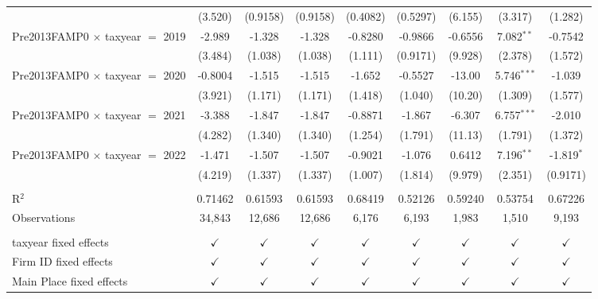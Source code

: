 \begin{tabular}{lcccccccc}
                                           & (3.520)       & (0.9158)      & (0.9158)      & (0.4082)       & (0.5297)        & (6.155)       & (3.317)       & (1.282)\\   
   Pre2013FAMP0 $\times$ taxyear $=$ 2019  & -2.989        & -1.328        & -1.328        & -0.8280        & -0.9866         & -0.6556       & 7.082$^{**}$  & -0.7542\\   
                                           & (3.484)       & (1.038)       & (1.038)       & (1.111)        & (0.9171)        & (9.928)       & (2.378)       & (1.572)\\   
   Pre2013FAMP0 $\times$ taxyear $=$ 2020  & -0.8004       & -1.515        & -1.515        & -1.652         & -0.5527         & -13.00        & 5.746$^{***}$ & -1.039\\   
                                           & (3.921)       & (1.171)       & (1.171)       & (1.418)        & (1.040)         & (10.20)       & (1.309)       & (1.577)\\   
   Pre2013FAMP0 $\times$ taxyear $=$ 2021  & -3.388        & -1.847        & -1.847        & -0.8871        & -1.867          & -6.307        & 6.757$^{***}$ & -2.010\\   
                                           & (4.282)       & (1.340)       & (1.340)       & (1.254)        & (1.791)         & (11.13)       & (1.791)       & (1.372)\\   
   Pre2013FAMP0 $\times$ taxyear $=$ 2022  & -1.471        & -1.507        & -1.507        & -0.9021        & -1.076          & 0.6412        & 7.196$^{**}$  & -1.819$^{*}$\\   
                                           & (4.219)       & (1.337)       & (1.337)       & (1.007)        & (1.814)         & (9.979)       & (2.351)       & (0.9171)\\   
    \\
   R$^2$                                   & 0.71462       & 0.61593       & 0.61593       & 0.68419        & 0.52126         & 0.59240       & 0.53754       & 0.67226\\  
   Observations                            & 34,843        & 12,686        & 12,686        & 6,176          & 6,193           & 1,983         & 1,510         & 9,193\\  
    \\
   taxyear fixed effects                   & $\checkmark$  & $\checkmark$  & $\checkmark$  & $\checkmark$   & $\checkmark$    & $\checkmark$  & $\checkmark$  & $\checkmark$\\   
   Firm ID fixed effects                   & $\checkmark$  & $\checkmark$  & $\checkmark$  & $\checkmark$   & $\checkmark$    & $\checkmark$  & $\checkmark$  & $\checkmark$\\   
   Main Place fixed effects                & $\checkmark$  & $\checkmark$  & $\checkmark$  & $\checkmark$   & $\checkmark$    & $\checkmark$  & $\checkmark$  & $\checkmark$\\   
   \bottomrule
\end{tabular}
\par\endgroup
